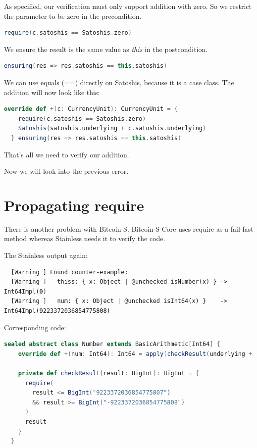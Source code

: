 As specified, our verification must only support addition with zero.
So we restrict the parameter to be zero in the precondition.
\begin{lstlisting}[language=scala]
  require(c.satoshis == Satoshis.zero)
\end{lstlisting}

We ensure the result is the same value as \emph{this} in the postcondition.
\begin{lstlisting}[language=scala]
  ensuring(res => res.satoshis == this.satoshis)
\end{lstlisting}

We can use equals (==) directly on Satoshis, because it is a case class.
The addition will now look like this:
\begin{lstlisting}[language=scala]
  override def +(c: CurrencyUnit): CurrencyUnit = {
    require(c.satoshis == Satoshis.zero)
    Satoshis(satoshis.underlying + c.satoshis.underlying)
  } ensuring(res => res.satoshis == this.satoshis)
\end{lstlisting}

That's all we need to verify our addition.

Now we will look into the previous error.


\section{Propagating require}

There is another problem with Bitcoin-S.
Bitcoin-S-Core uses require as a fail-fast method whereas Stainless needs it to verify the code.

The Stainless output again:
{\footnotesize\begin{verbatim}
  [Warning ] Found counter-example:
  [Warning ]   thiss: { x: Object | @unchecked isNumber(x) } -> Int64Impl(0)
  [Warning ]   num: { x: Object | @unchecked isInt64(x) }    -> Int64Impl(9223372036854775808)
\end{verbatim}}

Corresponding code:
\begin{lstlisting}[language=scala]
  sealed abstract class Number extends BasicArithmetic[Int64] {
    override def +(num: Int64): Int64 = apply(checkResult(underlying + num.underlying))

    private def checkResult(result: BigInt): BigInt = {
      require(
        result <= BigInt("9223372036854775807")
        && result >= BigInt("-9223372036854775808")
      )
      result
    }
  }
\end{lstlisting}

